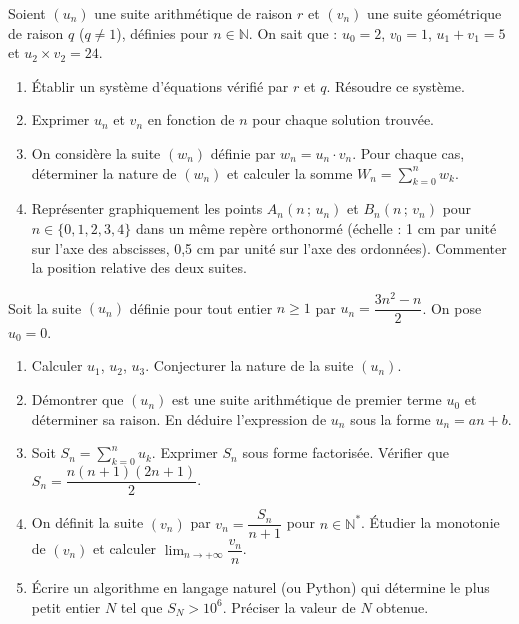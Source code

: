 \documentclass[11pt]{article}
\begin{document}
\begin{exercice}
Soient $(u_n)$ une suite arithmétique de raison $r$ et $(v_n)$ une suite géométrique de raison $q$ ($q \neq 1$), définies pour $n \in \mathbb{N}$. On sait que :
$u_0 = 2$, $v_0 = 1$, $u_1 + v_1 = 5$ et $u_2 \times v_2 = 24$.
\begin{enumerate}
    \item Établir un système d'équations vérifié par $r$ et $q$. Résoudre ce système.
    \item Exprimer $u_n$ et $v_n$ en fonction de $n$ pour chaque solution trouvée.
    \item On considère la suite $(w_n)$ définie par $w_n = u_n \cdot v_n$. Pour chaque cas, déterminer la nature de $(w_n)$ et calculer la somme $W_n = \sum_{k=0}^{n} w_k$.
    \item Représenter graphiquement les points $A_n(n\,;\, u_n)$ et $B_n(n\,;\, v_n)$ pour $n \in \{0,1,2,3,4\}$ dans un même repère orthonormé (échelle : 1 cm par unité sur l'axe des abscisses, 0,5 cm par unité sur l'axe des ordonnées). Commenter la position relative des deux suites.
\end{enumerate}
\end{exercice}

\begin{exercice}
Soit la suite $(u_n)$ définie pour tout entier $n \geq 1$ par $u_n = \dfrac{3n^2 - n}{2}$. On pose $u_0 = 0$.
\begin{enumerate}
    \item Calculer $u_1$, $u_2$, $u_3$. Conjecturer la nature de la suite $(u_n)$.
    \item Démontrer que $(u_n)$ est une suite arithmétique de premier terme $u_0$ et déterminer sa raison. En déduire l'expression de $u_n$ sous la forme $u_n = an + b$.
    \item Soit $S_n = \sum_{k=0}^{n} u_k$. Exprimer $S_n$ sous forme factorisée. Vérifier que $S_n = \dfrac{n(n+1)(2n+1)}{2}$.
    \item On définit la suite $(v_n)$ par $v_n = \dfrac{S_n}{n+1}$ pour $n \in \mathbb{N}^*$. Étudier la monotonie de $(v_n)$ et calculer $\lim_{n \to +\infty} \dfrac{v_n}{n}$.
    \item Écrire un algorithme en langage naturel (ou Python) qui détermine le plus petit entier $N$ tel que $S_N > 10^6$. Préciser la valeur de $N$ obtenue.
\end{enumerate}
\end{exercice}
\end{document}

